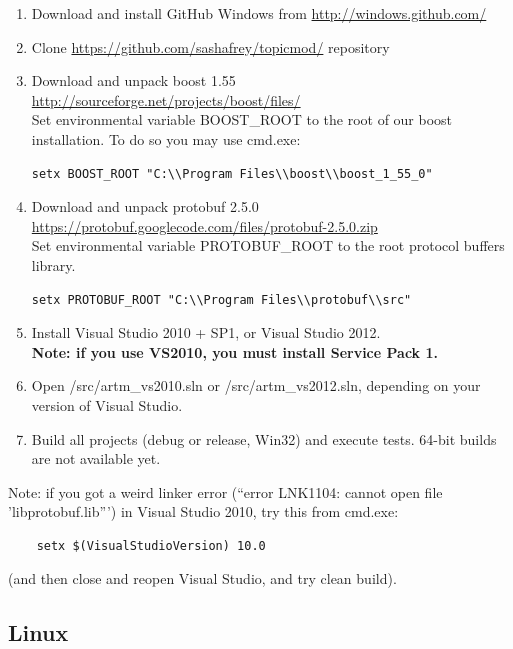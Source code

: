 \documentclass[11pt,a4paper,twoside]{report}
\begin{document}
\begin{enumerate}
   \item Download and install GitHub Windows from \url{http://windows.github.com/}
   \item Clone \url{https://github.com/sashafrey/topicmod/} repository
   \item Download and unpack boost 1.55  \\
         \url{http://sourceforge.net/projects/boost/files/} \\
         Set environmental variable BOOST\_ROOT to the root of our boost installation.
         To do so you may use cmd.exe:
\begin{verbatim}
setx BOOST_ROOT "C:\\Program Files\\boost\\boost_1_55_0"
\end{verbatim}
   \item Download and unpack protobuf 2.5.0 \\
         \url{https://protobuf.googlecode.com/files/protobuf-2.5.0.zip} \\
         Set environmental variable PROTOBUF\_ROOT to the root protocol buffers library.
\begin{verbatim}
setx PROTOBUF_ROOT "C:\\Program Files\\protobuf\\src"
\end{verbatim}
    \item Install Visual Studio 2010 + SP1, or Visual Studio 2012. \\
    {\bf Note: if you use VS2010, you must install Service Pack 1.}
    \item Open /src/artm\_vs2010.sln or /src/artm\_vs2012.sln, depending on your version of Visual Studio.
    \item Build all projects (debug or release, Win32) and execute tests. 64-bit builds are not available yet.
\end{enumerate}

Note: if you got a weird linker error (``error LNK1104: cannot open file 'libprotobuf.lib''')
      in Visual Studio 2010, try this from cmd.exe:
\begin{verbatim}
    setx $(VisualStudioVersion) 10.0
\end{verbatim}
(and then close and reopen Visual Studio, and try clean build).

\subsection{Linux}
\end{document}
